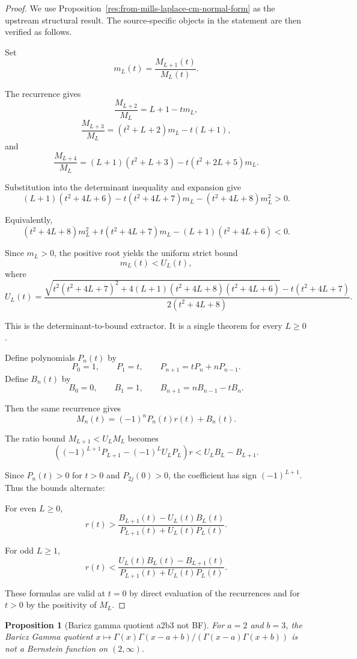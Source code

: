 \documentclass[11pt]{article}
\numberwithin{equation}{section}
\newtheorem{proposition}[theorem]{Proposition}
\theoremstyle{definition}
\theoremstyle{remark}
\newcommand{\1}{\mathbf 1}
\begin{document}
\begin{proof}
We use Proposition~\ref{res:from-mills-laplace-cm-normal-form} as the upstream structural result. The source-specific objects in the statement are then verified as follows.

Set
\[
m_L(t)=\frac{M_{L+1}(t)}{M_L(t)}.
\]

The recurrence gives
\[
\frac{M_{L+2}}{M_L}=L+1-tm_L,
\]
\[
\frac{M_{L+3}}{M_L}=(t^2+L+2)m_L-t(L+1),
\]
and
\[
\frac{M_{L+4}}{M_L}=(L+1)(t^2+L+3)-t(t^2+2L+5)m_L.
\]

Substitution into the determinant inequality and expansion give
\[
(L+1)(t^2+4L+6)-t(t^2+4L+7)m_L-(t^2+4L+8)m_L^2>0.
\]

Equivalently,
\[
(t^2+4L+8)m_L^2+t(t^2+4L+7)m_L-(L+1)(t^2+4L+6)<0.
\]

Since \(m_L>0\), the positive root yields the uniform strict bound
\[
m_L(t)<U_L(t),
\]
where
\[
U_L(t)=
\frac{
\sqrt{t^2(t^2+4L+7)^2+4(L+1)(t^2+4L+8)(t^2+4L+6)}
-t(t^2+4L+7)
}
{2(t^2+4L+8)}.
\]

This is the determinant-to-bound extractor. It is a single theorem for every \(L\ge0\).

Define polynomials \(P_n(t)\) by
\[
P_0=1,\qquad P_1=t,\qquad P_{n+1}=tP_n+nP_{n-1}.
\]
Define \(B_n(t)\) by
\[
B_0=0,\qquad B_1=1,\qquad B_{n+1}=nB_{n-1}-tB_n.
\]

Then the same recurrence gives
\[
M_n(t)=(-1)^nP_n(t)r(t)+B_n(t).
\]

The ratio bound \(M_{L+1}<U_LM_L\) becomes
\[
\left((-1)^{L+1}P_{L+1}-(-1)^L U_LP_L\right)r
<U_LB_L-B_{L+1}.
\]

Since \(P_n(t)>0\) for \(t>0\) and \(P_{2j}(0)>0\), the coefficient has sign \((-1)^{L+1}\). Thus the bounds alternate:

For even \(L\ge0\),
\[
r(t)>
\frac{B_{L+1}(t)-U_L(t)B_L(t)}
{P_{L+1}(t)+U_L(t)P_L(t)}.
\]

For odd \(L\ge1\),
\[
r(t)<
\frac{U_L(t)B_L(t)-B_{L+1}(t)}
{P_{L+1}(t)+U_L(t)P_L(t)}.
\]

These formulas are valid at \(t=0\) by direct evaluation of the recurrences and for \(t>0\) by the positivity of \(M_L\).
\end{proof}

\begin{proposition}[Baricz gamma quotient a2b3 not BF]
\label{res:baricz-gamma-quotient-a2b3-not-bf}
For \(a=2\) and \(b=3\), the Baricz Gamma quotient \(x\mapsto\Gamma(x)\Gamma(x-a+b)/(\Gamma(x-a)\Gamma(x+b))\) is not a Bernstein function on \((2,\infty)\).
\end{proposition}
\end{document}
